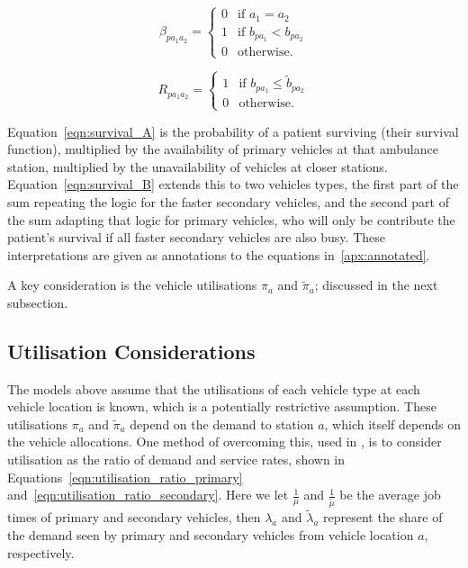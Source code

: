 \documentclass[numbers,webpdf,imaman]{ima-authoring-template}%
\begin{document}
\begin{equation}\label{eqn:beta}
\beta_{p a_1 a_2} = \begin{cases}
    0 & \text{if } a_1 = a_2\\
    1 & \text{if } b_{p a_1} < b_{p a_2}\\
    0 & \text{otherwise.}
\end{cases}
\end{equation}

\begin{equation}\label{eqn:R}
R_{p a_1 a_2} = \begin{cases}
    1 & \text{if } b_{p a_1} \leq \tilde{b}_{p a_2}\\
    0 & \text{otherwise.}
\end{cases}
\end{equation}

Equation~\ref{eqn:survival_A} is the probability of a patient surviving (their
survival function), multiplied by the availability of primary vehicles at that
ambulance station, multiplied by the unavailability of vehicles at closer
stations.
Equation~\ref{eqn:survival_B} extends this to two vehicles types, the first
part of the sum repeating the logic for the faster secondary vehicles, and the
second part of the sum adapting that logic for primary vehicles, who will only
be contribute the patient's survival if all faster secondary vehicles are also
busy. These interpretations are given as annotations to the equations
in~\ref{apx:annotated}.

A key consideration is the vehicle utilisations $\pi_a$ and $\tilde{\pi}_a$;
discussed in the next subsection.

\subsection{Utilisation Considerations}\label{sec:utilisation}
The models above assume that the utilisations of each vehicle type at each
vehicle location is known, which is a potentially restrictive assumption.
These utilisations $\pi_a$ and $\tilde{\pi}_a$ depend on the demand to station
$a$, which itself depends on the vehicle allocations. One method of overcoming
this, used in \citet{Knight2012918}, is to consider utilisation as the ratio of
demand and service rates, shown in Equations~\ref{eqn:utilisation_ratio_primary}
and~\ref{eqn:utilisation_ratio_secondary}. Here we let $\frac{1}{\mu}$ and
$\frac{1}{\tilde{\mu}}$ be the average job times of primary and secondary
vehicles, then $\lambda_a$ and $\tilde{\lambda}_a$ represent the share of the
demand seen by primary and secondary vehicles from vehicle location $a$,
respectively.
\end{document}
